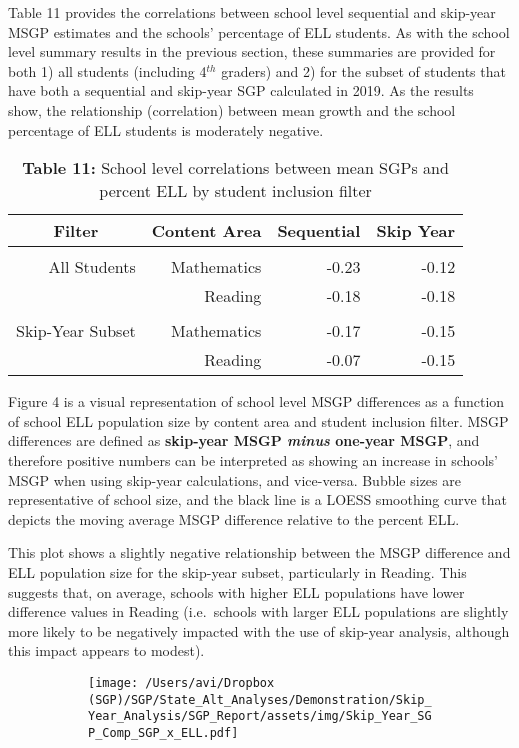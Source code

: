 \documentclass[12pt]{article}
\begin{document}
Table 11 provides the correlations between school level sequential and
skip-year MSGP estimates and the schools' percentage of ELL students. As
with the school level summary results in the previous section, these
summaries are provided for both 1) all students (including 4\(^{th}\)
graders) and 2) for the subset of students that have both a sequential
and skip-year SGP calculated in 2019. As the results show, the
relationship (correlation) between mean growth and the school percentage
of ELL students is moderately negative.

\begin{table}[H]
\caption*{\textbf{Table 11:} School level correlations between mean SGPs and percent ELL by student inclusion filter\label{table11}} 
\begin{center}
\begin{tabular}{rrrr}
\hline\hline
\multicolumn{1}{c}{Filter}&\multicolumn{1}{c}{Content Area}&\multicolumn{1}{c}{Sequential}&\multicolumn{1}{c}{Skip Year}\tabularnewline
\hline
&&&\tabularnewline
All Students&Mathematics&-0.23&-0.12\tabularnewline
&Reading&-0.18&-0.18\tabularnewline
\hline
&&&\tabularnewline
Skip-Year Subset&Mathematics&-0.17&-0.15\tabularnewline
&Reading&-0.07&-0.15\tabularnewline
\hline
\end{tabular}\end{center}
\end{table}

Figure 4 is a visual representation of school level MSGP differences as
a function of school ELL population size by content area and student
inclusion filter. MSGP differences are defined as \textbf{skip-year MSGP
\emph{minus} one-year MSGP}, and therefore positive numbers can be
interpreted as showing an increase in schools' MSGP when using skip-year
calculations, and vice-versa. Bubble sizes are representative of school
size, and the black line is a LOESS smoothing curve that depicts the
moving average MSGP difference relative to the percent ELL.

This plot shows a slightly negative relationship between the MSGP
difference and ELL population size for the skip-year subset,
particularly in Reading. This suggests that, on average, schools with
higher ELL populations have lower difference values in Reading
(i.e.~schools with larger ELL populations are slightly more likely to be
negatively impacted with the use of skip-year analysis, although this
impact appears to modest).

\begin{figure}[H]
\caption*{{{\bf{Figure 4:}} } Mean SGP difference by percent ELL by content area and student inclusion filter}
  \begin{subfigure}[b]{1\textwidth}
    \texttt{[image: /Users/avi/Dropbox (SGP)/SGP/State\_Alt\_Analyses/Demonstration/Skip\_Year\_Analysis/SGP\_Report/assets/img/Skip\_Year\_SGP\_Comp\_SGP\_x\_ELL.pdf]}
  \end{subfigure}
\end{figure}
\end{document}
